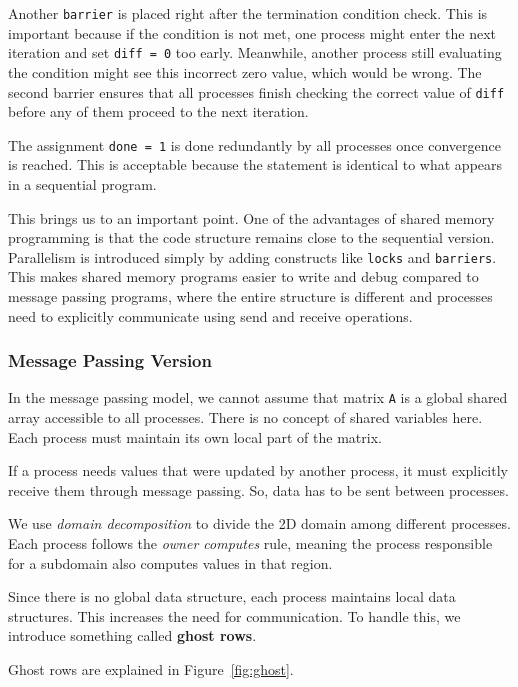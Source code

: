 \documentclass[12pt]{book}
\begin{document}
Another \texttt{barrier} is placed right after the termination condition check. This is important because if the condition is not met, one process might enter the next iteration and set \texttt{diff = 0} too early. Meanwhile, another process still evaluating the condition might see this incorrect zero value, which would be wrong. The second barrier ensures that all processes finish checking the correct value of \texttt{diff} before any of them proceed to the next iteration.

The assignment \texttt{done = 1} is done redundantly by all processes once convergence is reached. This is acceptable because the statement is identical to what appears in a sequential program.

This brings us to an important point. One of the advantages of shared memory programming is that the code structure remains close to the sequential version. Parallelism is introduced simply by adding constructs like \texttt{locks} and \texttt{barriers}. This makes shared memory programs easier to write and debug compared to message passing programs, where the entire structure is different and processes need to explicitly communicate using send and receive operations.


\subsubsection{Message Passing Version}

In the message passing model, we cannot assume that matrix \texttt{A} is a global shared array accessible to all processes. There is no concept of shared variables here. Each process must maintain its own local part of the matrix.

If a process needs values that were updated by another process, it must explicitly receive them through message passing. So, data has to be sent between processes.

We use \textit{domain decomposition} to divide the 2D domain among different processes. Each process follows the \textit{owner computes} rule, meaning the process responsible for a subdomain also computes values in that region.

Since there is no global data structure, each process maintains local data structures. This increases the need for communication. To handle this, we introduce something called \textbf{ghost rows}.

Ghost rows are explained in Figure~\ref{fig:ghost}.
\end{document}
